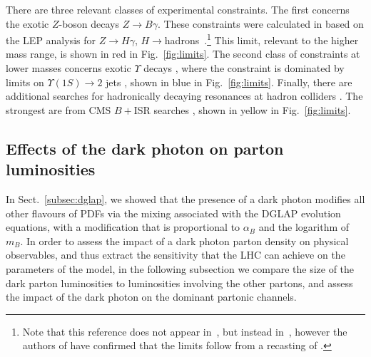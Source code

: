 \documentclass[withindex,glossary]{cam-thesis}
\begin{document}
There are three relevant classes of experimental constraints.  The first
concerns the exotic $Z$-boson decays $Z\to B\gamma$.  These constraints
were calculated in \cite{Dror:2017ehi} based on the LEP analysis for
$Z\to H\gamma$, $H\to$hadrons~\cite{L3:1996dmt}.\footnote{Note that
  this reference does not appear in~\cite{Dror:2017ehi}, but instead
  in~\cite{L3:1991kow,L3:1992kcg}, however the authors of
  \cite{Dror:2017ehi} have confirmed that the limits follow from a
  recasting of \cite{L3:1996dmt}.} This limit, relevant to the higher
mass range, is shown in red in Fig.~\ref{fig:limits}.  The second
class of constraints at lower masses concerns exotic $\Upsilon$ decays
\cite{Carone:1994aa,Aranda:1998fr}, where the constraint is dominated
by limits on $\Upsilon(1S)\to 2$ jets \cite{ARGUS:1986nzm}, shown in
blue in Fig.~\ref{fig:limits}. Finally, there are additional searches for
hadronically decaying resonances at hadron colliders
\cite{Dobrescu:2013cmh,Shimmin:2016vlc,ATLAS:2019itm,Dobrescu:2021vak}.
The strongest are from CMS $B+$ISR searches
\cite{CMS:2019xai,CMS:2019emo}, shown in yellow in
Fig.~\ref{fig:limits}. 

\subsection{Effects of the dark photon on parton luminosities}
In Sect.~\ref{subsec:dglap}, we showed that the presence of a dark photon modifies
all other flavours of PDFs via the mixing associated with the
DGLAP evolution equations, with a modification that is proportional to
$\alpha_B$ and the logarithm of $m_B$. 
In order to assess the impact of a dark photon
parton density on physical observables, and thus extract the 
sensitivity that the LHC can achieve on the
parameters of the model, in the following subsection
we compare the size of the dark parton luminosities to luminosities
involving the other partons, and assess the impact of the dark photon
on the dominant partonic channels.
\end{document}
